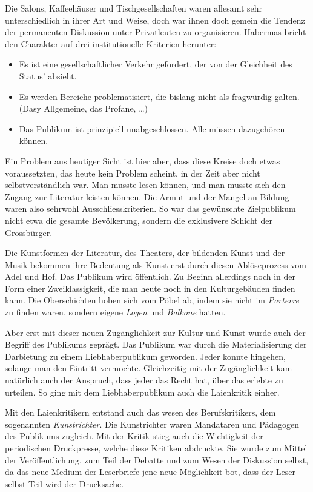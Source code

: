 \documentclass[a4paper,ngerman,11pt]{scrartcl}
\begin{document}
Die Salons, Kaffeehäuser und Tischgesellschaften waren allesamt sehr
unterschiedlich in ihrer Art und Weise, doch war ihnen doch gemein die Tendenz
der permanenten Diskussion unter Privatleuten zu organisieren. Habermas bricht
den Charakter auf drei institutionelle Kriterien herunter:

\clearpage

\begin{itemize}
\item Es ist eine gesellschaftlicher Verkehr gefordert, der von der Gleichheit des
Status' absieht.
\item Es werden Bereiche problematisiert, die bislang nicht als fragwürdig
galten. (Dasy Allgemeine, das Profane, \ldots{})
\item Das Publikum ist prinzipiell unabgeschlossen. Alle müssen dazugehören
können.\cite{Habermas1962}
\end{itemize}

Ein Problem aus heutiger Sicht ist hier aber, dass diese Kreise doch etwas
voraussetzten, das heute kein Problem scheint, in der Zeit aber nicht
selbstverständlich war. Man musste lesen können, und man musste sich den
Zugang zur Literatur leisten können. Die Armut und der Mangel an Bildung waren
also sehrwohl Ausschliesskriterien. So war das gewünschte Zielpublikum nicht
etwa die gesamte Bevölkerung, sondern die exklusivere Schicht der Grossbürger.

Die Kunstformen der Literatur, des Theaters, der bildenden Kunst und der Musik
bekommen ihre Bedeutung als Kunst erst durch diesen Ablöseprozess vom Adel und
Hof. Das Publikum wird öffentlich. Zu Beginn allerdings noch in der Form einer
Zweiklassigkeit, die man heute noch in den Kulturgebäuden finden kann. Die
Oberschichten hoben sich vom Pöbel ab, indem sie nicht im \emph{Parterre} zu finden
waren, sondern eigene \emph{Logen} und \emph{Balkone} hatten.

Aber erst mit dieser neuen Zugänglichkeit zur Kultur und Kunst wurde auch der
Begriff des Publikums geprägt. Das Publikum war durch die Materialisierung der
Darbietung zu einem Liebhaberpublikum geworden. Jeder konnte hingehen, solange
man den Eintritt vermochte. Gleichzeitig mit der Zugänglichkeit kam natürlich
auch der Anspruch, dass jeder das Recht hat, über das erlebte zu urteilen. So
ging mit dem Liebhaberpublikum auch die Laienkritik einher.

Mit den Laienkritikern entstand auch das wesen des Berufskritikers, dem
sogenannten \emph{Kunstrichter}.\cite{Habermas1962} Die Kunstrichter waren Mandataren
und Pädagogen des Publikums zugleich. Mit der Kritik stieg auch die
Wichtigkeit der periodischen Druckpresse, welche diese Kritiken abdruckte. Sie
wurde zum Mittel der Veröffentlichung, zum Teil der Debatte und zum Wesen der
Diskussion selbst, da das neue Medium der Leserbriefe jene neue Möglichkeit
bot, dass der Leser selbst Teil wird der Drucksache.
\end{document}
